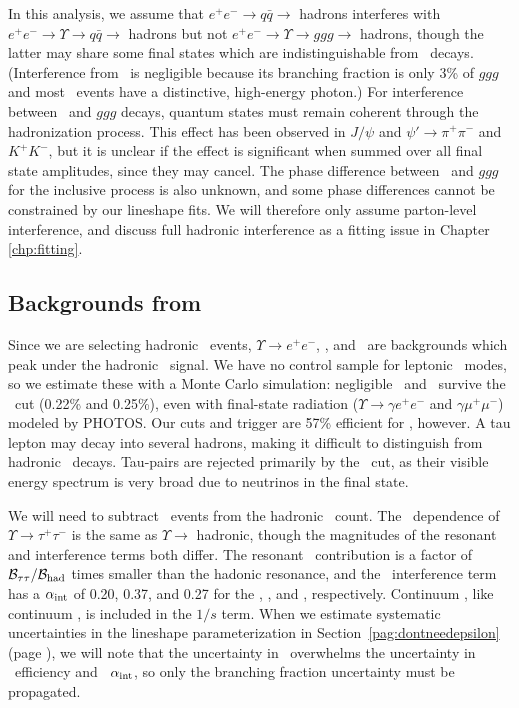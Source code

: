 \documentclass{cornell}
\begin{document}
In this analysis, we assume that $e^+e^- \to q\bar{q} \to$ hadrons
interferes with $e^+e^- \to \Upsilon \to q\bar{q} \to$ hadrons but not
$e^+e^- \to \Upsilon \to ggg \to$ hadrons, though the latter may share
some final states which are indistinguishable from \qqbar\ decays.
(Interference from \gggamma\ is negligible because its branching
fraction is only 3\% of $ggg$ and most \gggamma\ events have a
distinctive, high-energy photon.)  For interference between \qqbar\
and $ggg$ decays, quantum states must remain coherent through the
hadronization process.  This effect has been observed in $J/\psi$ and
$\psi' \to \pi^+\pi^-$ and $K^+K^-$, but it is unclear if the effect
is significant when summed over all final state amplitudes, since they
may cancel.  The phase difference between \qqbar\ and $ggg$ for the
inclusive process is also unknown, and some phase differences cannot
be constrained by our lineshape fits.  We will therefore only assume
parton-level interference, and discuss full hadronic interference as a
fitting issue in Chapter \ref{chp:fitting}.

\subsection{Backgrounds from \boldmath \ups}

Since we are selecting hadronic \ups\ events, $\Upsilon \to e^+e^-$,
\mumu, and \tautau\ are backgrounds which peak under the hadronic
\ups\ signal.  We have no control sample for leptonic \ups\ modes, so
we estimate these with a Monte Carlo simulation: negligible \ee\ and
\mumu\ survive the \pmax\ cut (0.22\% and 0.25\%), even with
final-state radiation ($\Upsilon \to \gamma e^+e^-$ and $\gamma
\mu^+\mu^-$) modeled by PHOTOS.  Our cuts and trigger are 57\%
efficient for \tautau, however.  A tau lepton may decay into several
hadrons, making it difficult to distinguish from hadronic \ups\
decays.  Tau-pairs are rejected primarily by the \visen\ cut, as their
visible energy spectrum is very broad due to neutrinos in the final
state.

We will need to subtract \tautau\ events from the hadronic \ups\
count.  The \ecm\ dependence of $\Upsilon \to \tau^+\tau^-$ is the
same as $\Upsilon \to$ hadronic, though the magnitudes of the resonant
and interference terms both differ.  The resonant \tautau\
contribution is a factor of ${\mathcal B}_{\tau\tau}/{\mathcal
B}_{\mbox{\scriptsize had}}$ times smaller than the hadonic resonance, and the
\tautau\ interference term has a $\alpha_{\mbox{\scriptsize int}}$ of 0.20, 0.37,
and 0.27 for the \us, \uss, and \usss, respectively.  Continuum
\tautau, like continuum \qqbar, is included in the $1/s$ term.  When
we estimate systematic uncertainties in the lineshape parameterization
in Section~\ref{pag:dontneedepsilon} (page
\pageref{pag:dontneedepsilon}), \label{pag:dontneedepsilonb} we will
note that the uncertainty in \btt\ overwhelms the uncertainty in
\tautau\ efficiency and \tautau\ $\alpha_{\mbox{\scriptsize int}}$, so only the
branching fraction uncertainty must be propagated.
\end{document}
